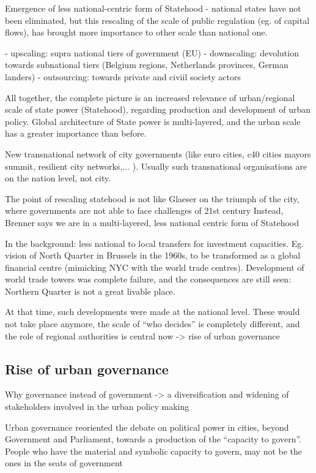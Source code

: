 \documentclass{article}
\begin{document}
Emergence of less national-centric form of Statehood - national states have not been eliminated, but this rescaling of the scale of public regulation (eg. of capital flows), has brought more importance to other scale than national one.

- upscaling: supra national tiers of government (EU)
- downscaling: devolution towards subnational tiers (Belgium regions, Netherlands provinces, German landers)
- outsourcing: towards private and civiil society actors

All together, the complete picture is an increased relevance of urban/regional scale of state power (Statehood), regarding production and development of urban policy.
Global architecture of State power is multi-layered, and the urban scale has a greater importance than before.

New transnational network of city governments (like euro cities, c40 cities mayors summit, resilient city networks,... ). Usually such transnational organisations are on the nation level, not city.

The point of rescaling statehood is not like Glaeser on the triumph of the city, where governments are not able to face challenges of 21st century
Instead, Brenner says we are in a multi-layered, less national centric form of Statehood 

In the background: less national to local transfers for investment capacities.
Eg. vision of North Quarter in Brussels in the 1960s, to be transformed as a global financial centre (mimicking NYC with the world trade centres). Development of world trade towers was complete failure, and the consequences are still seen: Northern Quarter is not a great livable place.

At that time, such developments were made at the national level. These would not take place anymore, the scale of ``who decides'' is completely different, and the role of regional authorities is central now -> rise of urban governance

\subsection{Rise of urban governance}

Why governance instead of government -> a diversification and widening of stakeholders involved in the urban policy making

Urban governance reoriented the debate on political power in cities, beyond Government and Parliament, towards a production of the ``capacity to govern''.
People who have the material and symbolic capacity to govern, may not be the ones in the seats of government
\end{document}
